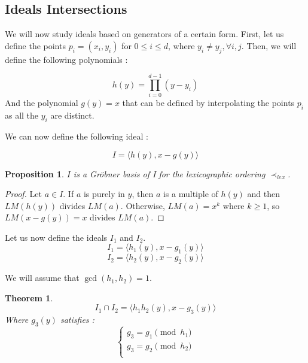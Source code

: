 \documentclass{article}
\newtheorem{theorem}{Theorem}[section]
\newtheorem{proposition}{Proposition}[section]
\begin{document}
\subsection{Ideals Intersections}

We will now study ideals based on generators of a certain form. 
First, let us define the points $p_{i} = (x_{i}, y_{i})$ for $0 \leq i \leq d$, where $y_{i} \neq y_{j}, \forall i, j$. 
Then, we will define the following polynomials : 

\begin{displaymath}
    h(y) = \prod_{i=0}^{d-1} (y - y_{i}) 
\end{displaymath}
And the polynomial $g(y) = x$ that can be defined by interpolating the points $p_{i}$ as all the $y_{i}$ are distinct. 

We can now define the following ideal : 

\begin{displaymath}
    I = \langle h(y), x - g(y) \rangle
\end{displaymath}

\begin{proposition}
    $I$ is a Gröbner basis of I for the lexicographic ordering $\prec_{lex}$.  
\end{proposition}

\begin{proof}
    Let $a \in I$. If $a$ is purely in $y$, then $a$ is a multiple of $h(y)$ and then $LM(h(y))$ divides $LM(a)$. Otherwise, $LM(a) = x^{k}$ where $k \geq 1$, so $LM(x - g(y)) = x$ divides $LM(a)$.
\end{proof}

Let us now define the ideals $I_{1}$ and $I_{2}$. 
\begin{displaymath}
    I_{1} = \langle h_{1}(y), x - g_{1}(y) \rangle
\end{displaymath}
\begin{displaymath}
    I_{2} = \langle h_{2}(y), x - g_{2}(y) \rangle
\end{displaymath}

We will assume that $\gcd(h_{1}, h_{2}) = 1$.

\begin{theorem}
    \begin{displaymath}
        I_{1} \cap I_{2} = \langle h_{1}h_{2}(y), x - g_{3}(y) \rangle
    \end{displaymath}
    Where $g_{3}(y)$ satisfies : %
    \begin{displaymath}
    \left\{
    \begin{array}{ll}
        g_{3} = g_{1} \pmod {h_{1}} \\
        g_{3} = g_{2} \pmod {h_{2}} \\
    \end{array}
    \right.
    \end{displaymath}
\end{theorem}
\end{document}
